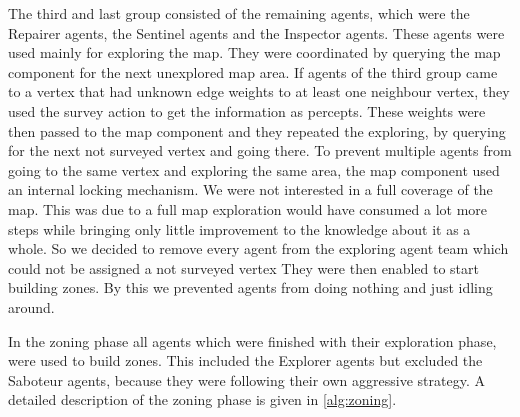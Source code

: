 The third and last group consisted of the remaining agents, which were the Repairer agents, the Sentinel agents and the Inspector agents.
These agents were used mainly for exploring the map.
They were coordinated by querying the map component for the next unexplored map area.
If agents of the third group came to a vertex that had unknown edge weights to at least one neighbour vertex, they used the survey action to get the information as percepts.
These weights were then passed to the map component and they repeated the exploring, by querying for the next not surveyed vertex and going there.
To prevent multiple agents from going to the same vertex and exploring the same area, the map component used an internal locking mechanism.
We were not interested in a full coverage of the map.
This was due to a full map exploration would have consumed a lot more steps while bringing only little improvement to the knowledge about it as a whole.
So we decided to remove every agent from the exploring agent team which could not be assigned a not surveyed vertex
They were then enabled to start building zones.
By this we prevented agents from doing nothing and just idling around.

In the zoning phase all agents which were finished with their exploration phase, were used to build zones.
This included the Explorer agents but excluded the Saboteur agents, because they were following their own aggressive strategy.
A detailed description of the zoning phase is given in \autoref{alg:zoning}.
